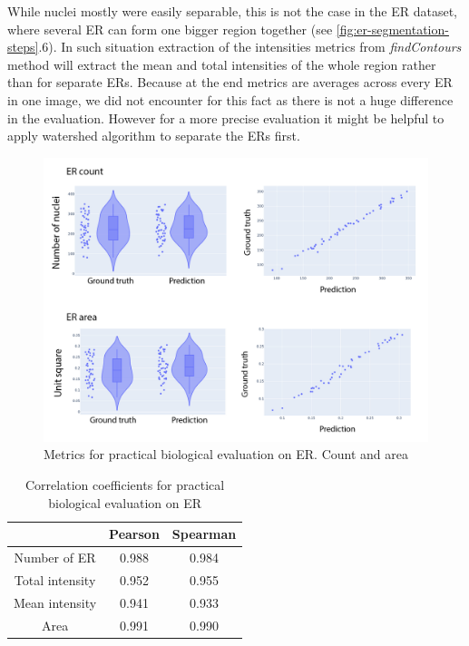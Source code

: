 While nuclei mostly were easily separable, this is not the case in the ER dataset, where several ER can form one bigger region together (see \ref{fig:er-segmentation-steps}.6). In such situation extraction of the intensities metrics from \textit{findContours} method will extract the mean and total intensities of the whole region rather than for separate ERs. Because at the end metrics are averages across every ER in one image, we did not encounter for this fact as there is not a huge difference in the evaluation. However for a more precise evaluation it might be helpful to apply watershed algorithm to separate the ERs first.

\begin{figure}[htb]
	\begin{center}
		\includegraphics[width=0.8\linewidth]{bilder/ER/metrics/combined-metrics-2.png}
		\caption{Metrics for practical biological evaluation on ER. Count and area}\label{fig:er-downstream-metrics-2}
	\end{center}
\end{figure}

\begin{table}[htb]
    \centering
    \caption{Correlation coefficients for practical biological evaluation on ER}
        \begin{adjustbox}{width=0.4\textwidth}
            \begin{tabular}{|c|c|c|}\hline
                &Pearson&Spearman
                \\\hline\hline
                Number of ER & 0.988 & 0.984\\\hline
                Total intensity&0.952&0.955\\\hline
                Mean intensity&0.941&0.933\\\hline
                Area &0.991&0.990\\\hline
            \end{tabular}
        \label{table:er-downstream-metrics-coefficients}
        \end{adjustbox}
\end{table}

